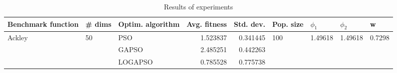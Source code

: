 \begin{table}
\centering
\caption{Results of experiments}
\begin{tabular}{lllrrllll}
\toprule
     Benchmark function &             \# dims & Optim. algorithm &  Avg. fitness &  Std. dev. &            Pop. size &               $\phi_{1}$ &               $\phi_{2}$ &                       w \\
\midrule
\multirow{3}{*}{Ackley} & \multirow{3}{*}{50} &              PSO &      1.523837 &   0.341445 & \multirow{3}{*}{100} & \multirow{3}{*}{1.49618} & \multirow{3}{*}{1.49618} & \multirow{3}{*}{0.7298} \\
                        &                     &            GAPSO &      2.485251 &   0.442263 &                      &                          &                          &                         \\
                        &                     &          LOGAPSO &      0.785528 &   0.775738 &                      &                          &                          &                         \\
\bottomrule
\end{tabular}
\end{table}
